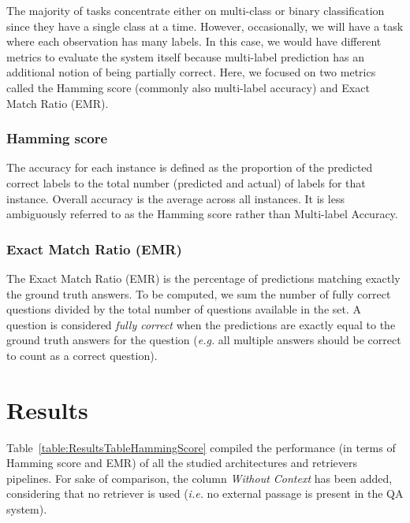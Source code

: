 \documentclass[11pt]{article}
\begin{document}
The majority of tasks concentrate either on multi-class or binary classification since they have a single class at a time. However, occasionally, we will have a task where each observation has many labels. In this case, we would have different metrics to evaluate the system itself because multi-label prediction has an additional notion of being partially correct.
Here, we focused on two metrics called the Hamming score (commonly also multi-label accuracy) and Exact Match Ratio (EMR).

\subsubsection{Hamming score}

The accuracy for each instance is defined as the proportion of the predicted correct labels to the total number (predicted and actual) of labels for that instance. Overall accuracy is the average across all instances. It is less ambiguously referred to as the Hamming score rather than Multi-label Accuracy.

\subsubsection{Exact Match Ratio (EMR)}

The Exact Match Ratio (EMR) is the percentage of predictions matching exactly the ground truth answers. To be computed, we sum the number of fully correct questions divided by the total number of questions available in the set. A question is considered {\it fully correct} when the predictions are exactly equal to the ground truth answers for the question ({\it e.g.} all multiple answers should be correct to count as a correct question).





\section{Results}
\label{s:results}

Table~\ref{table:ResultsTableHammingScore} compiled the performance (in terms of Hamming score and EMR) of all the studied architectures and retrievers pipelines. For sake of comparison, the column {\it Without Context} has been added, considering that no retriever is used ({\it i.e.} no external passage is present in the QA system).
\end{document}
